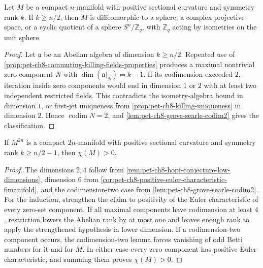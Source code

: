 \begin{theorem}
  \label{thm:pet-ch8-symmetry-rank-half-classification}

  Let $M$ be a compact $n$-manifold with positive sectional curvature and
  symmetry rank $k$. If $k\ge n/2$, then $M$ is diffeomorphic to a sphere, a
  complex projective space, or a cyclic quotient of a sphere $S^n/\mathbb{Z}_q$,
  with $\mathbb{Z}_q$ acting by isometries on the unit sphere.
\end{theorem}
\begin{proof}
  \sketch
  Let \(\mathfrak a\) be an Abelian algebra of dimension \(k\ge n/2\).
  Repeated use of
  \cref{prop:pet-ch8-commuting-killing-fields-properties} produces a maximal
  nontrivial zero component \(N\) with
  \(\dim(\mathfrak a|_N)=k-1\). If its codimension exceeded \(2\), iteration
  inside zero components would end in dimension \(1\) or \(2\) with at least
  two independent restricted fields. This contradicts the isometry-algebra
  bound in dimension \(1\), or first-jet uniqueness from
  \cref{prop:pet-ch8-killing-uniqueness} in dimension \(2\). Hence
  \(\operatorname{codim}N=2\), and
  \cref{lem:pet-ch8-grove-searle-codim2} gives the classification.
\end{proof}

\begin{theorem}
  \label{thm:pet-ch8-puttmann-searle-rong}

  If $M^{2n}$ is a compact $2n$-manifold with positive sectional curvature and
  symmetry rank $k\ge n/2-1$, then $\chi(M)>0$.
\end{theorem}
\begin{proof}
  \sketch
  The dimensions \(2,4\) follow from
  \cref{rem:pet-ch8-hopf-conjecture-low-dimensions}, dimension \(6\) from
  \cref{cor:pet-ch8-positive-euler-characteristic-6manifold}, and the
  codimension-two case from \cref{lem:pet-ch8-grove-searle-codim2}. For the
  induction, strengthen the claim to positivity of the Euler characteristic
  of every zero-set component. If all maximal components have codimension at
  least \(4\), restriction lowers the Abelian rank by at most one and leaves
  enough rank to apply the strengthened hypothesis in lower dimension. If a
  codimension-two component occurs, the codimension-two lemma forces
  vanishing of odd Betti numbers for it and for \(M\). In either case every
  zero component has positive Euler characteristic, and summing them proves
  \(\chi(M)>0\).
\end{proof}

